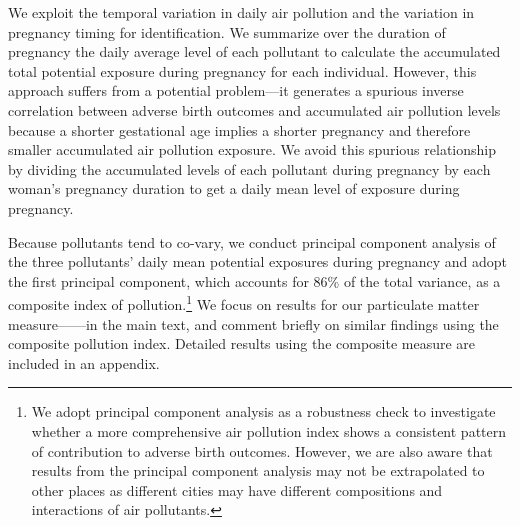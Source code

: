 We exploit the temporal variation in daily air pollution  and the variation in pregnancy timing for identification.  We summarize over the duration of pregnancy
the daily average level of each pollutant to calculate the
accumulated total potential exposure during pregnancy for each individual. However, this
approach suffers from a potential problem---it generates a spurious
inverse correlation between adverse birth outcomes and accumulated air
pollution levels because a shorter gestational age implies a shorter
pregnancy and therefore smaller accumulated air pollution exposure. We
avoid this spurious relationship by dividing the accumulated levels of
each pollutant during pregnancy by each woman's pregnancy duration to
get a daily mean level of exposure during pregnancy.

Because pollutants tend to co-vary, we conduct principal component
analysis of the three pollutants' daily mean potential exposures during
pregnancy and adopt the first principal component, which accounts for
86\% of the total variance, as a composite index of pollution.\footnote{We adopt principal component analysis as a robustness check to investigate whether a more comprehensive air pollution index shows a consistent pattern of contribution to adverse birth outcomes. However, we are also aware that results from the principal component analysis may not be extrapolated to other places as different cities may have different compositions and interactions of air pollutants.} We focus on
results for our particulate matter measure---\PARPMTEN---in the main text,
and comment briefly on similar findings using the composite pollution
index. Detailed results using the composite measure are included in an appendix.


